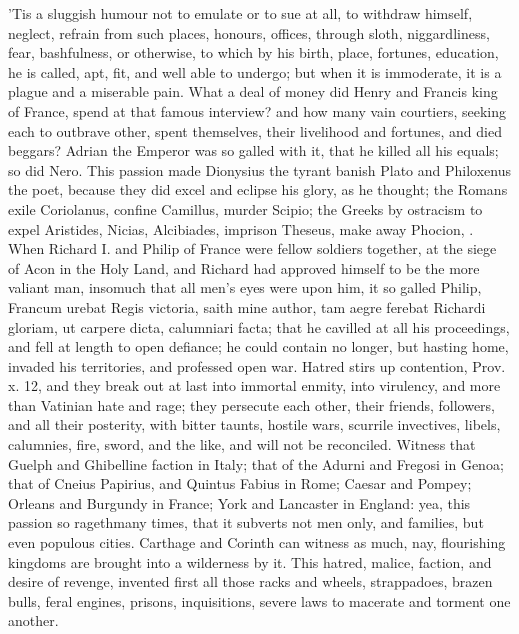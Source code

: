 {{'Tis a sluggish humour not to emulate or to sue at all, to withdraw
himself, neglect, refrain from such places, honours, offices, through
sloth, niggardliness, fear, bashfulness, or otherwise, to which by his
birth, place, fortunes, education, he is called, apt, fit, and well
able to undergo; but when it is immoderate, it is a plague and a
miserable pain. What a deal of money did Henry  and Francis 
king of France, spend at that famous interview? and how many vain
courtiers, seeking each to outbrave other, spent themselves, their
livelihood and fortunes, and died beggars? Adrian the Emperor was
so galled with it, that he killed all his equals; so did Nero. This
passion made Dionysius the tyrant banish Plato and Philoxenus the
poet, because they did excel and eclipse his glory, as he thought; the
Romans exile Coriolanus, confine Camillus, murder Scipio; the Greeks by
ostracism to expel Aristides, Nicias, Alcibiades, imprison Theseus,
make away Phocion, \etc{}. When Richard I. and Philip of France were fellow
soldiers together, at the siege of Acon in the Holy Land, and Richard
had approved himself to be the more valiant man, insomuch that all
men's eyes were upon him, it so galled Philip, Francum urebat Regis
victoria, saith mine author, tam aegre ferebat Richardi gloriam,
ut carpere dicta, calumniari facta; that he cavilled at all his
proceedings, and fell at length to open defiance; he could contain no
longer, but hasting home, invaded his territories, and professed open
war. Hatred stirs up contention, Prov. x. 12, and they break out at
last into immortal enmity, into virulency, and more than Vatinian hate
and rage; they persecute each other, their friends, followers,
and all their posterity, with bitter taunts, hostile wars, scurrile
invectives, libels, calumnies, fire, sword, and the like, and will not
be reconciled. Witness that Guelph and Ghibelline faction in Italy;
that of the Adurni and Fregosi in Genoa; that of Cneius Papirius, and
Quintus Fabius in Rome; Caesar and Pompey; Orleans and Burgundy in
France; York and Lancaster in England: yea, this passion so
ragethmany times, that it subverts not men only, and families,
but even populous cities. Carthage and Corinth can witness as
much, nay, flourishing kingdoms are brought into a wilderness by it.
This hatred, malice, faction, and desire of revenge, invented first all
those racks and wheels, strappadoes, brazen bulls, feral engines,
prisons, inquisitions, severe laws to macerate and torment one another.
}}
